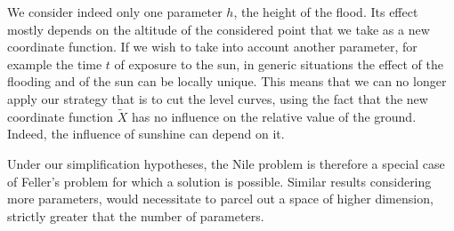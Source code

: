 \documentclass[A4paper, 12pt]{article}
\begin{document}
We consider indeed only one parameter $h$, the height of the
flood. Its effect mostly depends on the altitude of the considered
point that we take as a new coordinate function. If we wish to take
into account another parameter, for example the time $t$ of exposure
to the sun, in generic situations the effect of the flooding and of
the sun can be locally unique. This means that we can no longer apply
our strategy that is to cut the level curves, using the fact that the
new coordinate function $\tilde X$ has no influence on the relative
value of the ground. Indeed, the influence of sunshine can depend on
it. 

Under our simplification hypotheses, the Nile problem is therefore a
special case of Feller's problem for which a solution is
possible. Similar results considering more parameters, would
necessitate to parcel out a space of higher dimension, strictly
greater that the number of parameters.

 
 
\end{document}
